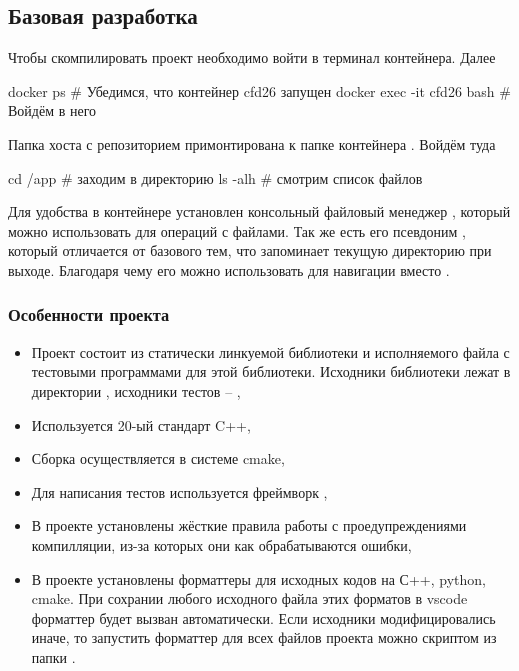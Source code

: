 \subsection{Базовая разработка}
\label{sec:howto_basic_dev}
Чтобы скомпилировать проект необходимо войти в терминал контейнера.
Далее
\begin{shelloutput}
docker ps                   # Убедимся, что контейнер cfd26 запущен
docker exec -it cfd26 bash  # Войдём в него
\end{shelloutput}
Папка хоста с репозиторием  примонтирована к папке контейнера \ename{\app}.
Войдём туда
\begin{shelloutput}
cd /app   # заходим в директорию
ls -alh   # смотрим список файлов
\end{shelloutput}
Для удобства в контейнере установлен консольный файловый менеджер ,
который можно использовать для операций с файлами. Так же есть его псевдоним ,
который отличается от базового  тем, что запоминает текущую директорию при выходе.
Благодаря чему его можно использовать для навигации вместо .

\subsubsection{Особенности проекта}
\begin{itemize}
\item Проект состоит из статически линкуемой библиотеки  и исполняемого файла с тестовыми программами для этой библиотеки.
      Исходники библиотеки лежат в директории , исходники тестов -- ,
\item Используется 20-ый стандарт C++,
\item Сборка осуществляется в системе cmake,
\item Для написания тестов используется фреймворк ,
\item В проекте установлены жёсткие правила работы с проедупреждениями компилляции, из-за которых они как обрабатываются ошибки,
\item В проекте установлены форматтеры для исходных кодов на С++, python, cmake. При сохрании любого исходного файла этих форматов в vscode
      форматтер будет вызван автоматически. Если исходники модифицировались иначе, то запустить форматтер для всех файлов проекта
      можно скриптом  из папки \ename{\app}.
\end{itemize}

